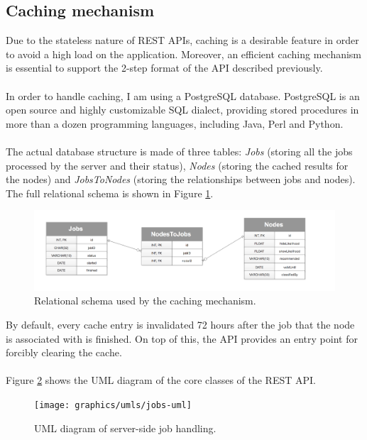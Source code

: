 	\subsection{Caching mechanism} \label{Section: impl/REST/caching}
	Due to the stateless nature of REST APIs, caching is a desirable feature in order to avoid a high load on the application. Moreover, an efficient caching mechanism is essential to support the 2-step format of the API described previously. 
	\\ \\
	In order to handle caching, I am using a PostgreSQL database. PostgreSQL is an open source and highly customizable SQL dialect, providing stored procedures in more than a dozen programming languages, including Java, Perl and Python. 
	\\ \\
	The actual database structure is made of three tables: \textit{Jobs} (storing all the jobs processed by the server and their status), \textit{Nodes} (storing the cached results for the nodes) and \textit{JobsToNodes} (storing the relationships between jobs and nodes). The full relational schema is shown in Figure \ref{Fig: impl/REST/cache/relational}.
	\begin{figure}[H]
		\centering
		\includegraphics[width=\textwidth]{graphics/cache-schema}
		\caption[Cache schema]{Relational schema used by the caching mechanism.}
		\label{Fig: impl/REST/cache/relational}
	\end{figure}
	By default, every cache entry is invalidated 72 hours after the job that the node is associated with is finished. On top of this, the API provides an entry point for forcibly clearing the cache. 
	\\ \\
	Figure \ref{Fig: impl/REST/cache/jobs} shows the UML diagram of the core classes of the REST API.
	\begin{figure}[H]
		\centering
		\texttt{[image: graphics/umls/jobs-uml]}
		\caption{UML diagram of server-side job handling.}
		\label{Fig: impl/REST/cache/jobs}
	\end{figure}
	
